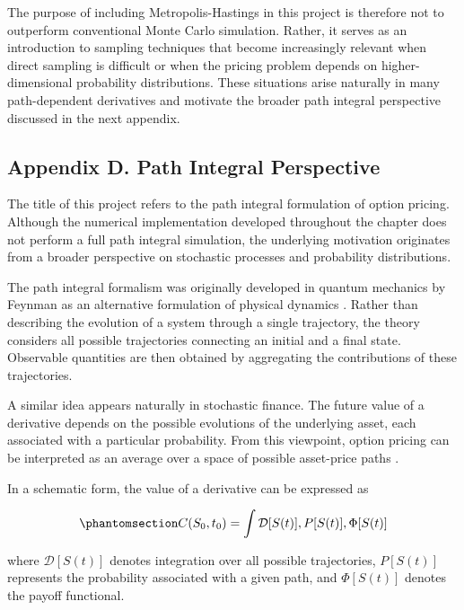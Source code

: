 \documentclass[
  12pt,
  letterpaper,
]{book}
\begin{document}
The purpose of including Metropolis-Hastings in this project is
therefore not to outperform conventional Monte Carlo simulation. Rather,
it serves as an introduction to sampling techniques that become
increasingly relevant when direct sampling is difficult or when the
pricing problem depends on higher-dimensional probability distributions.
These situations arise naturally in many path-dependent derivatives and
motivate the broader path integral perspective discussed in the next
appendix.

\subsection{Appendix D. Path Integral
Perspective}\label{appendix-d.-path-integral-perspective}

The title of this project refers to the path integral formulation of
option pricing. Although the numerical implementation developed
throughout the chapter does not perform a full path integral simulation,
the underlying motivation originates from a broader perspective on
stochastic processes and probability distributions.

The path integral formalism was originally developed in quantum
mechanics by Feynman as an alternative formulation of physical dynamics
. Rather than describing the
evolution of a system through a single trajectory, the theory considers
all possible trajectories connecting an initial and a final state.
Observable quantities are then obtained by aggregating the contributions
of these trajectories.

A similar idea appears naturally in stochastic finance. The future value
of a derivative depends on the possible evolutions of the underlying
asset, each associated with a particular probability. From this
viewpoint, option pricing can be interpreted as an average over a space
of possible asset-price paths .

In a schematic form, the value of a derivative can be expressed as

\begin{equation}\phantomsection\label{eq-path-integral-pricing}{
C(S_0,t_0)
=
\int \mathcal{D}[S(t)]
,P[S(t)]
,\Phi[S(t)]
}\end{equation}

where \(\mathcal{D}[S(t)]\) denotes integration over all possible
trajectories, \(P[S(t)]\) represents the probability associated with a
given path, and \(\Phi[S(t)]\) denotes the payoff functional.
\end{document}
